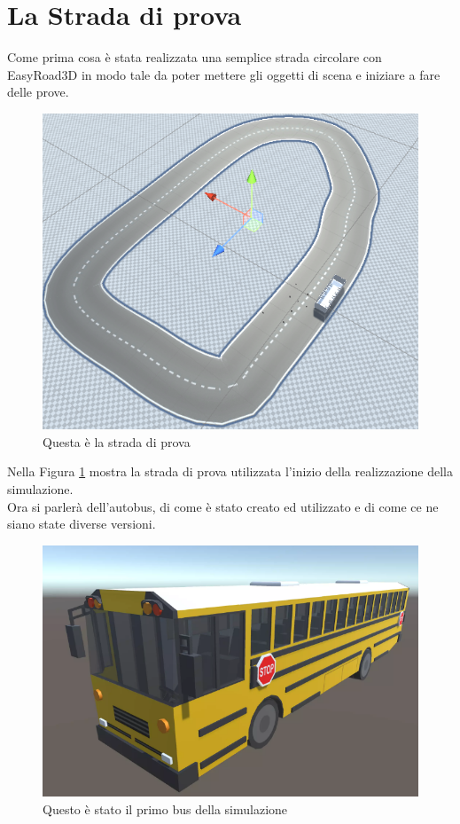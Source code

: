 \documentclass[12pt, openany]{book}
\begin{document}
	\section{La Strada di prova}
	Come prima cosa è stata realizzata una semplice strada circolare con EasyRoad3D in modo tale da poter mettere gli oggetti di scena e iniziare a fare delle prove.
	\begin{figure}[H]
		\centering
		\includegraphics[width=0.7\linewidth]{"Immagini/StradaBase.png"}
		\caption{Questa è la strada di prova}
		\label{fig:StradaBase}
	\end{figure}
	Nella Figura \ref{fig:StradaBase} mostra la strada di prova utilizzata l'inizio della realizzazione della simulazione.\\
	Ora si parlerà dell'autobus, di come è stato creato ed utilizzato e di come ce ne siano state diverse versioni. 
	\begin{figure}[H]
		\centering
		\includegraphics[width=0.7\linewidth]{"Immagini/SchoolBus.png"}
		\caption{Questo è stato il primo bus della simulazione}
		\label{fig:SchoolBus}
	\end{figure}
\end{document}
